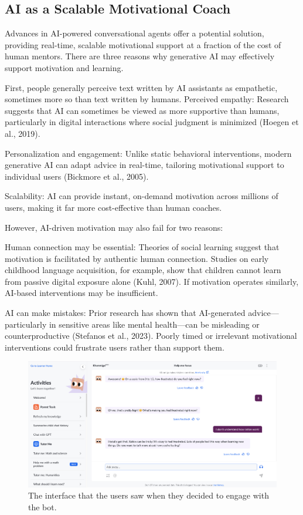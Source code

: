 \documentclass[11pt]{report}
\begin{document}
\begin{mainf}
\subsection{AI as a Scalable Motivational Coach}
Advances in AI-powered conversational agents offer a potential solution, providing real-time, scalable motivational support at a fraction of the cost of human mentors. 
There are three reasons why generative AI may effectively support motivation and learning.

First, people generally perceive text written by AI assistants as empathetic, sometimes more so than text written by humans. 
Perceived empathy: Research suggests that AI can sometimes be viewed as more supportive than humans, particularly in digital interactions where social judgment is minimized (Hoegen et al., 2019).

Personalization and engagement: Unlike static behavioral interventions, modern generative AI can adapt advice in real-time, tailoring motivational support to individual users (Bickmore et al., 2005).

Scalability: AI can provide instant, on-demand motivation across millions of users, making it far more cost-effective than human coaches.

However, AI-driven motivation may also fail for two reasons:

Human connection may be essential: Theories of social learning suggest that motivation is facilitated by authentic human connection. 
Studies on early childhood language acquisition, for example, show that children cannot learn from passive digital exposure alone (Kuhl, 2007). 
If motivation operates similarly, AI-based interventions may be insufficient.

AI can make mistakes: Prior research has shown that AI-generated advice—particularly in sensitive areas like mental health—can be misleading or counterproductive (Stefanos et al., 2023). 
Poorly timed or irrelevant motivational interventions could frustrate users rather than support them.

\begin{figure}
    \centering
    \includegraphics[width=0.95\linewidth]{interface.png}
    \caption{The interface that the users saw when they decided to engage with the bot.}
    \label{fig:interface}
\end{figure}


\end{mainf}
\end{document}
